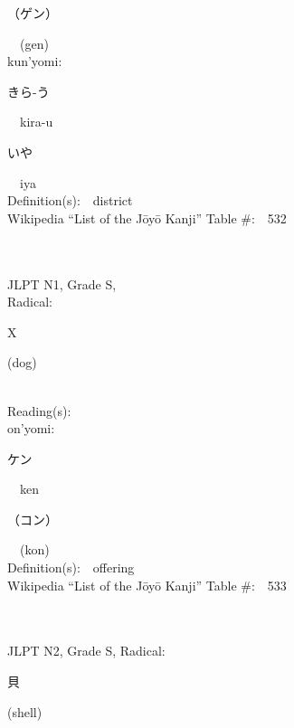 \begin{multicols}{2}
{\hspace*{2em}}{\begin{CJK}{UTF8}{min} （ゲン） \end{CJK}}\ \ (gen)\ \ \\
{\hspace*{1em}}kun'yomi:\ \ \\
{\hspace*{2em}}{\begin{CJK}{UTF8}{min} きら-う \end{CJK}}\ \ kira-u\ \ \\
{\hspace*{2em}}{\begin{CJK}{UTF8}{min} いや \end{CJK}}\ \ iya\ \ \\
Definition(s):\ \ district \\
Wikipedia ``List of the J\=oy\=o Kanji'' Table \#:\ \ 532 \\
\ \ \\
{\fontsize{34pt}{40pt}  }\ \ \\
{JLPT N1, Grade S, \\Radical:\ \ {\begin{CJK}{UTF8}{min} X \end{CJK}} (dog) } \\
Reading(s):\ \ \\
{\hspace*{1em}}on'yomi:\ \ \\
{\hspace*{2em}}{\begin{CJK}{UTF8}{min} ケン \end{CJK}}\ \ ken\ \ \\
{\hspace*{2em}}{\begin{CJK}{UTF8}{min} （コン） \end{CJK}}\ \ (kon)\ \ \\
Definition(s):\ \ offering \\
Wikipedia ``List of the J\=oy\=o Kanji'' Table \#:\ \ 533 \\
\ \ \\
{\fontsize{34pt}{40pt}  }\ \ \\  %
{JLPT N2, Grade S, Radical:\ \ {\begin{CJK}{UTF8}{min} 貝 \end{CJK}} (shell) } \\

\end{multicols}
